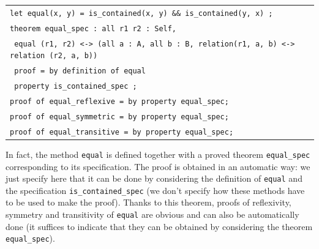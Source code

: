 \documentclass[submission,copyright,creativecommons]{eptcs}
\begin{document}
\begin{center}
\begin{scriptsize}
\begin{tabular}{|l|}
\hline
{\tt let equal(x, y) = is\_contained(x, y) \&\& is\_contained(y, x) ;}\\
{\tt theorem equal\_spec : all r1 r2 : Self,} \\
{\tt \hspace{0.2cm} equal (r1, r2) <-> (all a : A, all b : B, relation(r1, a, b) <-> relation (r2, a, b))} \\
{\tt \hspace{0.2cm}  proof = by definition of equal} \\
{\tt \hspace{2.1cm} property is\_contained\_spec ;}\\
{\tt proof of equal\_reflexive = by property equal\_spec;}\\
{\tt proof of equal\_symmetric = by property equal\_spec;}\\
{\tt proof of equal\_transitive = by property equal\_spec;}\\
\hline
\end{tabular}
\end{scriptsize}
\end{center}

\noindent
In fact, the method  {\footnotesize \tt equal} is defined
together with a proved theorem  {\footnotesize \tt equal\_spec} corresponding to its specification.
The proof is obtained in an automatic way: we just specify here that
it can be done by considering the definition of {\footnotesize \tt equal} 
and the specification {\footnotesize \tt is\_contained\_spec} (we
don't specify how these methods have to be used to make the proof).
Thanks
to this theorem, proofs of reflexivity, symmetry and transitivity of 
{\footnotesize \tt equal} are obvious and can also be automatically done
(it suffices to indicate that they can be obtained by considering the
theorem {\footnotesize \tt equal\_spec}). 
\end{document}
